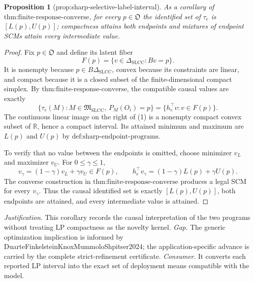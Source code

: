 \documentclass{article}
\newtheorem{proposition}{Proposition}
\begin{document}
\begin{proposition}[prop:sharp-selective-label-interval]\label{prop:sharp-selective-label-interval}
As a corollary of \(\text{thm:finite-response-converse}\), for every \(p\in\mathfrak O\) the identified set of \(\tau_e\) is \([L(p),U(p)]\); compactness attains both endpoints and mixtures of endpoint SCMs attain every intermediate value.
\end{proposition}
\begin{proof}
Fix \(p\in\mathfrak O\) and define its latent fiber
\[
F(p)=\{v\in\Delta_{\mathrm{SLCC}}:Bv=p\}.
\]
It is nonempty because \(p\in B\Delta_{\mathrm{SLCC}}\), convex because its constraints are linear, and compact because it is a closed subset of the finite-dimensional compact simplex.  By \(\text{thm:finite-response-converse}\), the compatible causal values are exactly
\[
\{\tau_e(M):M\in\mathfrak M_{\mathrm{SLCC}},\ P_M(O_i)=p\}
=\{h_e^{\top}v:v\in F(p)\}.
\tag{1}
\]
The continuous linear image on the right of (1) is a nonempty compact convex subset of \(\mathbb R\), hence a compact interval.  Its attained minimum and maximum are \(L(p)\) and \(U(p)\) by \(\text{def:sharp-endpoint-programs}\).

To verify that no value between the endpoints is omitted, choose minimizer \(v_L\) and maximizer \(v_U\).  For \(0\leq\gamma\leq1\),
\[
v_\gamma=(1-\gamma)v_L+\gamma v_U\in F(p),
\qquad
h_e^{\top}v_\gamma=(1-\gamma)L(p)+\gamma U(p).
\]
The converse construction in \(\text{thm:finite-response-converse}\) produces a legal SCM for every \(v_\gamma\).  Thus the causal identified set is exactly \([L(p),U(p)]\), both endpoints are attained, and every intermediate value is attained.
\end{proof}
\par\smallskip\noindent \textit{Justification.} This corollary records the causal interpretation of the two programs without treating LP compactness as the novelty kernel. \textit{Gap.} The generic optimization implication is informed by DuarteFinkelsteinKnoxMummoloShpitser2024; the application-specific advance is carried by the complete strict-refinement certificate. \textit{Consumer.} It converts each reported LP interval into the exact set of deployment means compatible with the model.
\end{document}
